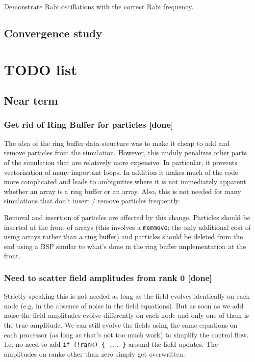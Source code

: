 \documentclass[aps, superscriptaddress, groupedaddress, preprint]{revtex4}
\begin{document}
Demonstrate Rabi oscillations with the correct Rabi frequency.


\subsection{Convergence study}


\section{TODO list}

\subsection{Near term}

\subsubsection{Get rid of Ring Buffer for particles {\bf [done]}}

The idea of the ring buffer data structure was to make it cheap
to add and remove particles from the simulation.  However, this
unduly penalizes other parts of the simulation that are
relatively more expensive.  In particular, it prevents
vectorization of many important loops.  In addition it makes much
of the code more complicated and leads to ambiguities where it is
not immediately apparent whether an array is a ring buffer or an
array.  Also, this is not needed for many simulations that don't
insert / remove particles frequently.

Removal and insertion of particles are affected by this change.
Particles should be inserted at the front of arrays (this
involves a \verb~memmove~; the only additional cost of using
arrays rather than a ring buffer) and particles should be deleted
from the end using a BSP similar to what's done in the ring
buffer implementation at the front.


\subsubsection{Need to scatter field amplitudes from rank 0 {\bf
[done]}}

Strictly speaking this is not needed as long as the field evolves
identically on each node (e.g. in the absence of noise in the
field equations).  But as soon as we add noise the field
amplitudes evolve differently on each node and only one of them
is the true amplitude.  We can still evolve the fields using the
same equations on each processor (as long as that's not too much
work) to simplify the control flow.  I.e. no need to add 
\verb~if (!rank) { ... }~ around the field updates.  The
amplitudes on ranks other than zero simply get overwritten.
\end{document}
